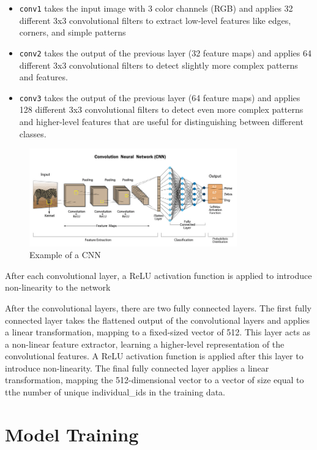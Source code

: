 \documentclass{article}
\begin{document}
\begin{itemize}
    \item \verb|conv1|  takes the input image with 3 color channels (RGB) and applies 32 different 3x3 convolutional filters to extract low-level features like edges, corners, and simple patterns
    \item \verb|conv2| takes the output of the previous layer (32 feature maps) and applies 64 different 3x3 convolutional filters to detect slightly more complex patterns and features.
    \item \verb|conv3| takes the output of the previous layer (64 feature maps) and applies 128 different 3x3 convolutional filters to detect even more complex patterns and higher-level features that are useful for distinguishing between different classes.
\end{itemize}

\begin{figure}
    \centering
    \includegraphics[width=0.8\textwidth]{cnn.png}
    \caption{Example of a CNN}
    \label{fig:network_architecture}
\end{figure}



After each convolutional layer, a ReLU activation function is applied to introduce non-linearity to the network

After the convolutional layers, there are two fully connected layers. The first fully connected layer takes the flattened output of the convolutional layers and applies a linear transformation, mapping to a fixed-sized vector of 512. This layer acts as a non-linear feature extractor, learning a higher-level representation of the convolutional features. A ReLU activation function is applied after this layer to introduce non-linearity.
The final fully connected layer applies a linear transformation, mapping the 512-dimensional vector to a vector of size equal to tthe number of unique individual\_ids in the training data.


\section{Model Training}
\end{document}
